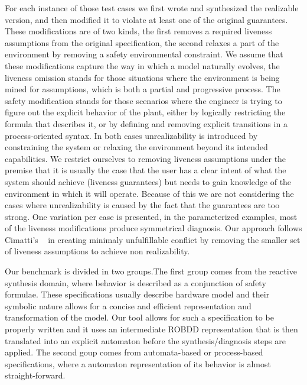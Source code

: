 For each instance of those test cases we first wrote and synthesized the realizable version, and then modified it
to violate at least one of the original guarantees. 
These modifications are of two kinds, the first removes a required liveness assumptions from the original specification, the second relaxes a part of the environment by removing a safety environmental constraint. We assume that these modifications capture the way in which a model naturally evolves, the liveness omission stands for those situations where the environment is being mined for assumptions, which is both a partial and progressive process. The safety modification stands for those scenarios where the engineer is trying to figure out the explicit behavior of the plant, either by logically restricting the formula that describes it, or by defining and removing explicit transitions in a process-oriented syntax. In both cases unrealizability is introduced by constraining the system or relaxing the environment beyond its intended capabilities. We restrict ourselves to removing liveness assumptions under the premise that it is usually the case that the user has a clear intent of what the system should achieve (liveness guarantees) but needs to gain knowledge of the environment in which it will operate.  Because of this we are not considering the cases where unrealizability is caused by the fact that the guarantees are too strong. One variation per case is presented, in the parameterized examples, most of the liveness modifications produce symmetrical diagnosis. Our approach follows Cimatti's ~\cite{DBLP:conf/vmcai/CimattiRST08} in creating minimaly unfulfillable conflict by removing the smaller set of liveness assumptions to achieve non realizability.
 
Our benchmark is divided in two groups.The first group comes from the reactive synthesis domain, where behavior is described as a conjunction of safety formulae. These specifications usually describe hardware model and their symbolic nature allows for a concise and efficient representation and transformation of the model.  Our tool allows for such a specification to be properly written and it uses an intermediate ROBDD representation that is then translated into an explicit automaton before the synthesis/diagnosis steps are applied. The second goup comes from automata-based or process-based specifications, where a automaton representation of its behavior is almost straight-forward.

